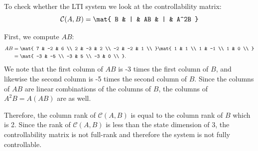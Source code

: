 \documentclass{homework}
\begin{document}
\begin{letterenum}
To check whether the LTI system we look at the controllability matrix:
\begin{equation*}
    \mathcal{C}(A, B) = \mat{
        B & | & AB & | & A^2B
    }
\end{equation*}

First, we compute $AB$:
\begin{align*}
    AB &= \mat{
        7 & -2 & 6 \\
        2 & -3 & 2 \\
        -2 & -2 & 1 \\
    } \mat{
        1 & 1 \\
        1 & -1 \\
        1 & 0 \\
    }  \\
    &= \mat{
        -3 & -5 \\
        -3 & 5 \\
        -3 & 0 \\
    }.
\end{align*}
We note that the first column of $AB$ is -3 times the first column of
$B$, and likewise the second column is -5 times the second column of $B$. 
Since the columns of $AB$ are linear combinations of the columns of $B$,
the columns of $A^2B = A(AB)$ are as well.

Therefore, the column rank of $\mathcal{C}(A, B)$ is equal to the column
rank of $B$ which is 2. Since the rank of $\mathcal{C}(A, B)$ 
is less than the state dimension of 3, the controllability matrix is
not full-rank and therefore the system is not fully controllable.

\end{letterenum}
\end{document}
